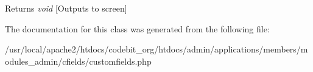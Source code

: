 \begin{DoxyReturn}{Returns}
{\itshape void} \mbox{[}Outputs to screen\mbox{]} 
\end{DoxyReturn}


The documentation for this class was generated from the following file\-:\begin{DoxyCompactItemize}
\item 
/usr/local/apache2/htdocs/codebit\-\_\-org/htdocs/admin/applications/members/modules\-\_\-admin/cfields/customfields.\-php\end{DoxyCompactItemize}
